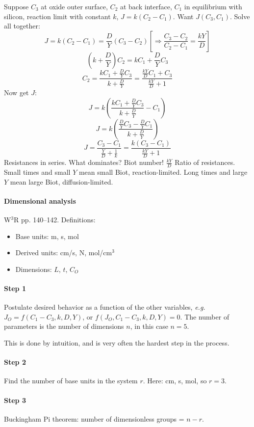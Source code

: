 \documentclass{report}
\begin{document}
\label{thecalc}
Suppose $C_3$ at oxide outer surface, $C_2$ at back interface, $C_1$ in
equilibrium with silicon, reaction limit with constant $k$, $J=k(C_2-C_1)$.
Want $J(C_3,C_1)$.  Solve all together:
$$J = k(C_2-C_1) = \frac{D}{Y}(C_3-C_2) \left[\Rightarrow
  \frac{C_3-C_2}{C_2-C_1} = \frac{kY}{D}\right]$$
$$\left(k+\frac{D}{Y}\right) C_2 = k C_1 + \frac{D}{Y} C_3$$
$$C_2 = \frac{kC_1 + \frac{D}{Y} C_3}{k+\frac{D}{Y}} =
\frac{\frac{kY}{D} C_1 + C_3}{\frac{kY}{D} + 1}$$
Now get $J$:
$$J = k\left(\frac{kC_1 + \frac{D}{Y} C_3}{k+\frac{D}{Y}} - C_1\right)$$
$$J = k\left(\frac{\frac{D}{Y} C_3 - \frac{D}{Y} C_1}{k+\frac{D}{Y}}\right)$$
$$J = \frac{C_3 - C_1}{\frac{Y}{D} + \frac{1}{k}} =
\frac{k(C_3-C_1)}{\frac{kY}{D} + 1}$$
Resistances in series.  What dominates?  Biot number!  $\frac{kY}{D}$  Ratio of
resistances.  Small times and small $Y$ mean small Biot, reaction-limited.
Long times and large $Y$ mean large Biot, diffusion-limited.

\paragraph{Dimensional analysis}

W$^3$R pp. 140--142.  Definitions:
\begin{itemize}
\item Base units: m, s, mol
\item Derived units: cm/s, N, mol/cm$^3$
\item Dimensions: $L$, $t$, $C_O$
\end{itemize}

\paragraph{Step 1} Postulate desired behavior as a function of the other
variables, {\em e.g.} $J_O = f(C_1-C_3, k, D, Y)$, or $f (J_O, C_1-C_3, k, D,
Y) = 0$.  The number of parameters is the number of dimensions $n$, in this
case $n=5$.

This is done by intuition, and is very often the hardest step in the process.

\paragraph{Step 2} Find the number of base units in the system $r$.  Here: cm,
s, mol, so $r=3$.

\paragraph{Step 3} Buckingham Pi theorem: number of dimensionless groups =
$n-r$.
\end{document}
